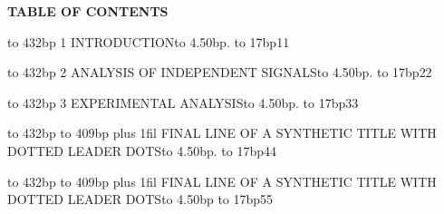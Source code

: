 \documentclass[12pt]{article}
\newcommand{\tocrow}[3][.]{%
  \noindent\hbox to 432bp{%
    #2\leaders\hbox to 4.50bp{\hfil#1\hfil}\hfill
    \hbox to 17bp{\hfil#3}}\par}
\begin{document}
\begin{center}\textbf{TABLE OF CONTENTS}\end{center}
\vspace{12bp}
\tocrow{1 INTRODUCTION}{11}
\vspace{10bp}
\tocrow{2 ANALYSIS OF INDEPENDENT SIGNALS}{22}
\vspace{10bp}
\tocrow{3 EXPERIMENTAL ANALYSIS}{33}
\vspace{10bp}

\tocrow{\hbox to 409bp{\spaceskip=3bp plus 1fil FINAL LINE OF A SYNTHETIC TITLE WITH DOTTED LEADER DOTS}}{44}
\vspace{10bp}
\tocrow[\phantom{.}]{\hbox to 409bp{\spaceskip=3bp plus 1fil\relax 5 FINAL LINE OF A SYNTHETIC TITLE WITH DOTTED LEADER DOTS}}{55}
\end{document}
